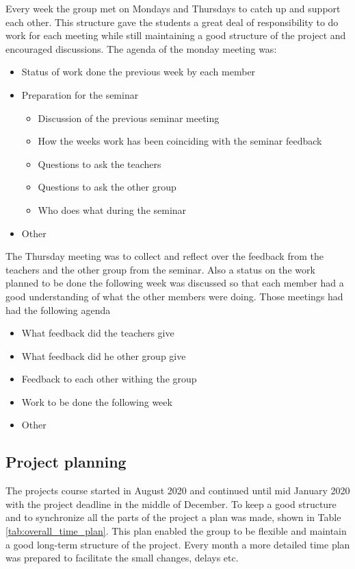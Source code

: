 Every week the group met on Mondays and Thursdays to catch up and support each other. This structure gave the students a great deal of responsibility to do work for each meeting while still maintaining a good structure of the project and encouraged discussions. 
The agenda of the monday meeting was:
\begin{itemize}
    \item Status of work done the previous week by each member
    \item Preparation for the seminar
    \begin{itemize}
        \item Discussion of the previous seminar meeting
        \item How the weeks work has been coinciding with the seminar feedback
        \item Questions to ask the teachers
        \item Questions to ask the other group
        \item Who does what during the seminar
    \end{itemize}
    \item Other
\end{itemize}
The Thursday meeting was to collect and reflect over the 
feedback from the teachers and the other group from the seminar. Also a status on the work planned to be done the following week was discussed so that each member had a good understanding of what the other members were doing. Those meetings had had the following agenda
\begin{itemize}
    \item What feedback did the teachers give
    \item What feedback did he other group give 
    \item Feedback to each other withing the group
    \item Work to be done the following week
    \item Other 
\end{itemize}

\subsection{Project planning}
The projects course started in August 2020 and continued until mid January 2020 with the project deadline in the middle of December. To keep a good structure and to synchronize all the parts of the project a plan was made, shown in Table \ref{tab:overall_time_plan}. This plan enabled the group to be flexible and maintain a good long-term structure of the project. Every month a more detailed time plan was prepared to facilitate the small changes, delays etc. 



